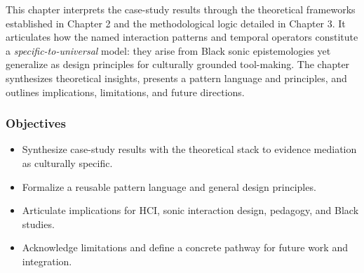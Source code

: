 

This chapter interprets the case-study results through the theoretical frameworks established in Chapter 2 and the methodological logic detailed in Chapter 3. It articulates how the named interaction patterns and temporal operators constitute a \textit{specific-to-universal} model: they arise from Black sonic epistemologies yet generalize as design principles for culturally grounded tool-making. The chapter synthesizes theoretical insights, presents a pattern language and principles, and outlines implications, limitations, and future directions.

\subsubsection{Objectives}
\begin{itemize}[nosep]
	\item Synthesize case-study results with the theoretical stack to evidence mediation as culturally specific.
	\item Formalize a reusable pattern language and general design principles.
	\item Articulate implications for HCI, sonic interaction design, pedagogy, and Black studies.
	\item Acknowledge limitations and define a concrete pathway for future work and integration.
\end{itemize}


